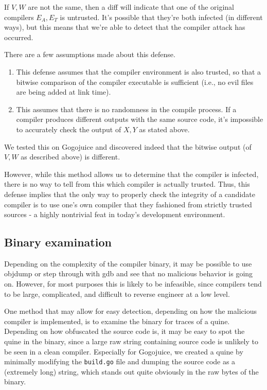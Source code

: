 \documentclass[10pt]{sigplanconf}
\begin{document}
If $V,W$ are not the same, then a diff will indicate that one of the original compilers $E_A, E_T$ is untrusted. It’s possible that they’re both infected (in different ways), but this means that we’re able to detect that the compiler attack has occurred.

There are a few assumptions made about this defense.

\begin{enumerate}
\item This defense assumes that the compiler environment is also trusted, so that a bitwise comparison of the compiler executable is sufficient (i.e., no evil files are being added at link time).
\item This assumes that there is no randomness in the compile process. If a compiler produces different outputs with the same source code, it’s impossible to accurately check the output of $X,Y$ as stated above.
\end{enumerate}

We tested this on Gogojuice and discovered indeed that the bitwise output (of $V,W$ as described above) is different.

However, while this method allows us to determine that the compiler is infected, there is no way to tell from this which compiler is actually trusted. Thus, this defense implies that the only way to properly check the integrity of a candidate compiler is to use one's own compiler that they fashioned from strictly trusted sources - a highly nontrivial feat in today's development environment. 

\subsection{Binary examination}

Depending on the complexity of the compiler binary, it may be possible to use objdump or step through with gdb and see that no malicious behavior is going on. However, for most purposes this is likely to be infeasible, since compilers tend to be large, complicated, and difficult to reverse engineer at a low level.

One method that may allow for easy detection, depending on how the malicious compiler is implemented, is to examine the binary for traces of a quine. Depending on how obfuscated the source code is, it may be easy to spot the quine in the binary, since a large raw string containing source code is unlikely to be seen in a clean compiler. Especially for Gogojuice, we created a quine by minimally modifying the \texttt{build.go} file and dumping the source code as a (extremely long) string, which stands out quite obviously in the raw bytes of the binary.
\end{document}
